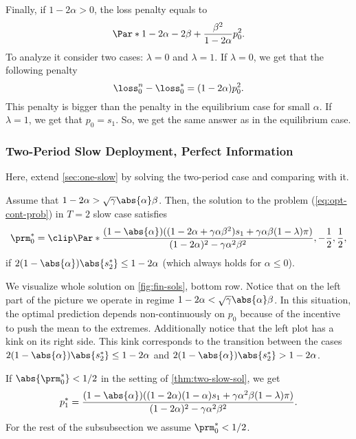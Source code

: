 Finally, if $1 - 2 \alpha > 0$, the loss penalty equals to
\[
    \Par*{1 - 2 \alpha - 2 \beta + \frac{\beta^2}{1 - 2 \alpha}} p_0^2.
\]
To analyze it consider two cases: $\lambda = 0$ and $\lambda = 1$. If $\lambda
= 0$, we get that the following penalty
\[
    \loss^n_0 - \loss^*_0 = (1 - 2 \alpha) p_0^2.
\]
This penalty is bigger than the penalty in the equilibrium case for small
$\alpha$. If $\lambda = 1$, we get that $p_0 = s_1$. So, we get the same answer
as in the equilibrium case.

\subsubsection{Two-Period Slow Deployment, Perfect Information}

Here, extend \cref{sec:one-slow} by solving the two-period case and comparing
with it.

\begin{proposition}
    \label{thm:two-slow-sol}
    Assume that $1 - 2 \alpha > \sqrt{\gamma} \abs{\alpha} \beta$. Then, the
    solution to the problem (\ref{eq:opt-cont-prob}) in $T=2$ slow case
    satisfies
    \[
        \prm^*_0 = \clip\Par*{\frac{(1  -  \abs{\alpha}) ((1  -  2
        \alpha  +  \gamma \alpha \beta^2) s_1 + \gamma \alpha \beta (1 -
        \lambda) \pi)}{(1 - 2 \alpha)^2 - \gamma \alpha^2 \beta^2},
        -\frac{1}{2}, \frac{1}{2}},
    \]
    if $2 (1 - \abs{\alpha}) \abs{s^*_2} \le 1 - 2 \alpha$ (which always holds
    for $\alpha \le 0$).
\end{proposition}

We visualize whole solution on \cref{fig:fin-sols}, bottom row. Notice that on
the left part of the picture we operate in regime $1 - 2 \alpha < \sqrt{\gamma}
\abs{\alpha} \beta$. In this situation, the optimal prediction depends
non-continuously on $p_0$ because of the incentive to push the mean to the
extremes. Additionally notice that the left plot has a kink on its right side.
This kink corresponds to the transition between the cases $2 (1 - \abs{\alpha})
\abs{s^*_2} \le 1 - 2 \alpha$ and $2 (1 - \abs{\alpha}) \abs{s^*_2} > 1 - 2
\alpha$.

If $\abs{\prm^*_0} < 1/2$ in the setting of \cref{thm:two-slow-sol}, we get
\[
    p^*_1 = \frac{(1 - \abs{\alpha}) ((1 - 2 \alpha) (1 - \alpha) s_1 +
    \gamma \alpha^2 \beta (1 - \lambda) \pi)}{(1 - 2 \alpha)^2 - \gamma
    \alpha^2 \beta^2}.
\]
For the rest of the subsubsection we assume $\prm^*_0 < 1/2$.

